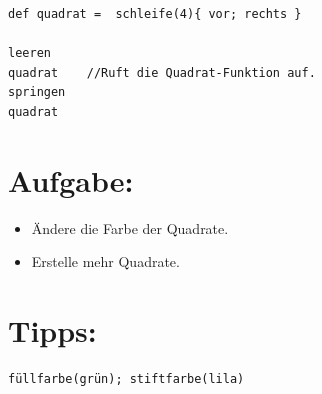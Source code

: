 \begin{lstlisting}[basicstyle={\ttfamily\fontsize{20}{24}\selectfont},numbers=none]
def quadrat =  schleife(4){ vor; rechts }  

leeren
quadrat    //Ruft die Quadrat-Funktion auf.
springen
quadrat
\end{lstlisting}
        
\section*{\color{BrickRed}Aufgabe:}


\begin{itemize}

\item {Ändere die Farbe der Quadrate.}
\item {Erstelle mehr Quadrate.}

\end{itemize}


\section*{\color{OliveGreen}Tipps:}

\begin{lstlisting}[numbers=none]
füllfarbe(grün); stiftfarbe(lila)
\end{lstlisting}
        
